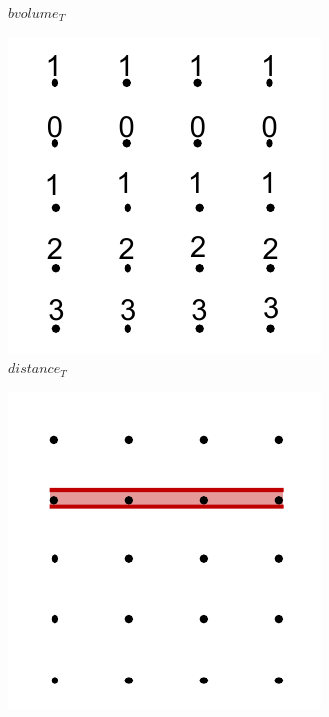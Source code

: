 \begin{figure}[!b]
\begin{subfigure}{0.243\linewidth}
\vspace{-5mm}
\caption{$bvolume_{T}$}
\label{fig:bvolumeT}
\end{subfigure}
\begin{subfigure}{0.243\linewidth}
\includegraphics[width=\linewidth]{Images/distanceT.pdf}
\vspace{-5mm}
\caption{$distance_{T}$}
\label{fig:distanceT}
\end{subfigure}
\begin{subfigure}{0.243\linewidth}
\includegraphics[width=\linewidth]{Images/zlsT.pdf}

\end{subfigure}
\end{figure}
